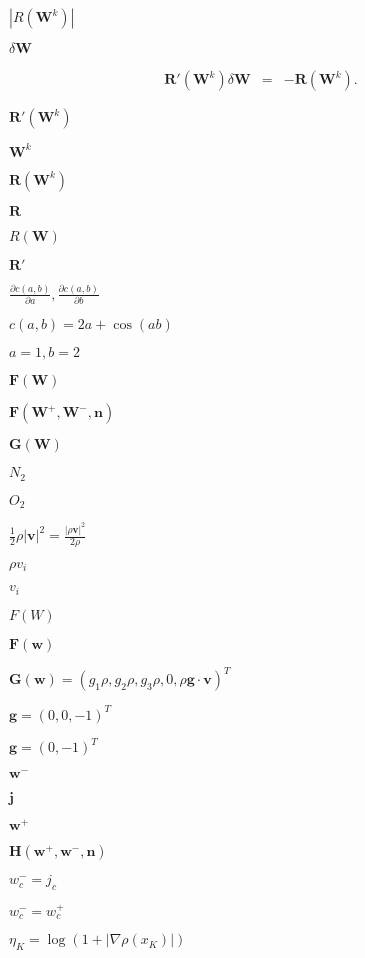 \documentclass{article}
\begin{document}
$|R(\mathbf{W}^k)|$
\pagebreak

$\delta \mathbf W$
\pagebreak

\begin{eqnarray*} \mathbf R'(\mathbf{W}^k)\delta \mathbf{W} & = & - \mathbf R(\mathbf{W}^{k}). \end{eqnarray*}
\pagebreak

$\mathbf R'(\mathbf W^k)$
\pagebreak

$\mathbf W^k$
\pagebreak

$\mathbf R(\mathbf W^k)$
\pagebreak

$\mathbf R$
\pagebreak

$R(\mathbf{W})$
\pagebreak

$\mathbf R'$
\pagebreak

$\frac{\partial c(a,b)}{\partial a}, \frac{\partial c(a,b)}{\partial b}$
\pagebreak

$c(a,b)=2a+\cos(ab)$
\pagebreak

$a=1,b=2$
\pagebreak

$\mathbf F(\mathbf W)$
\pagebreak

$\mathbf F(\mathbf W^+,\mathbf W^-,\mathbf n)$
\pagebreak

$\mathbf G(\mathbf W)$
\pagebreak

$N_2$
\pagebreak

$O_2$
\pagebreak

$\frac 12 \rho |\mathbf v|^2 = \frac{|\rho \mathbf v|^2}{2\rho}$
\pagebreak

$\rho v_i$
\pagebreak

$v_i$
\pagebreak

$F(W)$
\pagebreak

$\mathbf F(\mathbf w)$
\pagebreak

$\mathbf G(\mathbf w) = \left( g_1\rho, g_2\rho, g_3\rho, 0, \rho \mathbf g \cdot \mathbf v \right)^T$
\pagebreak

$\mathbf g=(0,0,-1)^T$
\pagebreak

$\mathbf g=(0,-1)^T$
\pagebreak

$\mathbf w^-$
\pagebreak

$\mathbf j$
\pagebreak

$\mathbf w^+$
\pagebreak

$\mathbf H(\mathbf{w}^+, \mathbf{w}^-, \mathbf{n})$
\pagebreak

$w^-_c = j_c$
\pagebreak

$w^-_c = w^+_c$
\pagebreak

$\eta_K=\log\left(1+|\nabla\rho(x_K)|\right)$
\pagebreak
\end{document}

